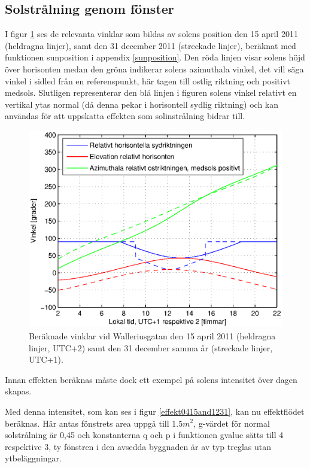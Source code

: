 \subsection{Solstrålning genom fönster}

I figur \ref{fig:sun0415and1231} ses de relevanta vinklar som bildas av solens position den 15 april 2011 (heldragna linjer), samt den 31 december 2011 (streckade linjer), beräknat med funktionen sunposition i appendix \ref{sunposition}. Den röda linjen visar solens höjd över horisonten medan den gröna indikerar solens azimuthala vinkel, det vill säga vinkel i sidled från en referenspunkt, här tagen till ostlig riktning och positivt medsols. Slutligen representerar den blå linjen i figuren solens vinkel relativt en vertikal ytas normal (då denna pekar i horisontell sydlig riktning) och kan användas för att uppskatta effekten som solinstrålning bidrar till.

\begin{figure}[hpbt]
\centering
\includegraphics[scale=0.8]{images/sun0415and1231.eps}
\caption{\label{fig:sun0415and1231} Beräknade vinklar vid Walleriusgatan den 15 april 2011 (heldragna linjer, UTC+2) samt den 31 december samma år (streckade linjer, UTC+1).}
\end{figure}

Innan effekten beräknas måste dock ett exempel på solens intensitet över dagen skapas. %

Med denna intensitet, som kan ses i figur \ref{effekt0415and1231}, kan nu effektflödet beräknas.
Här antas fönstrets area uppgå till $\unit{1.5}{m^2}$,%
g-värdet för normal solstrålning är 0,45 %
och konstanterna q och p i funktionen gvalue sätts till 4 respektive 3, ty fönstren i den avsedda byggnaden är av typ treglas utan ytbeläggningar.

